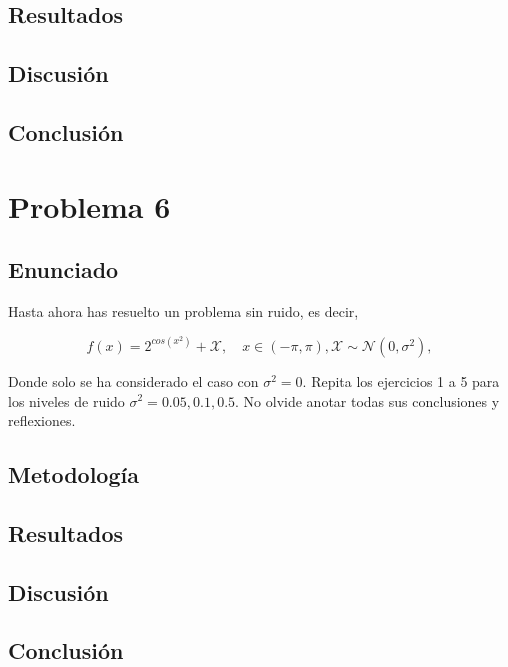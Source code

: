 \documentclass{article}
\begin{document}
\subsection{Resultados}
\setcounter{equation}{0}

\subsection{Discusión}

\subsection{Conclusión}

\section{Problema 6}

\subsection{Enunciado}

Hasta ahora has resuelto un problema sin ruido, es decir,

\begin{equation*}
    f(x)=2^{cos(x^2)}+\mathcal{X}, \quad x \in (-\pi,\pi), \mathcal{X} \sim \mathcal{N}(0,\sigma^{2}),
\end{equation*}

Donde solo se ha considerado el caso con $\sigma^2=0$. Repita los ejercicios 1 a 5 para los niveles de ruido $\sigma^2 = 0.05,0.1,0.5$. No olvide anotar todas sus conclusiones y reflexiones.

\subsection{Metodología}

\subsection{Resultados}
\setcounter{equation}{0}

\subsection{Discusión}

\subsection{Conclusión}
\end{document}
